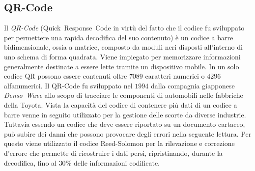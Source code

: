 \subsection{QR-Code}
	\label{subsec:qrcode}
Il \emph{QR-Code} (Quick~Response~Code in virtù del fatto che il codice fu sviluppato per permettere una rapida decodifica del suo contenuto) è un codice a barre bidimensionale, ossia a matrice, composto da moduli neri disposti all'interno di uno schema di forma quadrata. Viene impiegato per memorizzare informazioni generalmente destinate a essere lette tramite un dispositivo mobile. In un solo codice QR possono essere contenuti oltre $7089$ caratteri numerici o $4296$ alfanumerici.
Il QR-Code fu sviluppato nel $1994$ dalla compagnia giapponese \emph{Denso~Wave} allo scopo di tracciare le componenti di automobili nelle fabbriche della Toyota. Vista la capacità del codice di contenere più dati di un codice a barre venne in seguito utilizzato per la gestione delle scorte da diverse industrie.
Tuttavia essendo un codice che deve essere riportato su un documento cartaceo, può subire dei danni che possono provocare degli errori nella seguente lettura.
Per questo viene utilizzato il codice Reed-Solomon per la rilevazione e correzione d'errore che permette di ricostruire i dati persi, ripristinando, durante la decodifica, fino al $30\%$ delle informazioni codificate.


